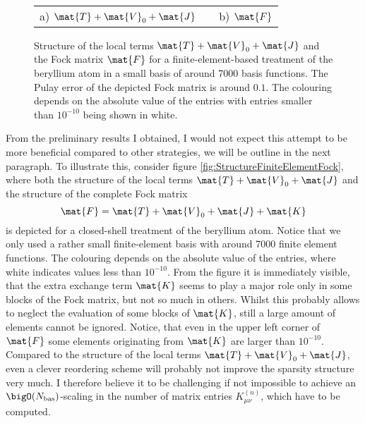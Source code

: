 \begin{figure}
	\centering
	\\[-0.7em]
	\begin{tabularx}{0.67\textwidth}{XcX}
		a) $\mat{T} + \mat{V}_0 + \mat{J}$ & \hspace{0.27\textwidth} &
		\hspace{0.02\textwidth}b) $\mat{F}$
	\end{tabularx}
	\caption[Local terms and Fock matrix for a finite-element-based Hartree-Fock]
		{Structure of the local terms $\mat{T}+\mat{V}_0 + \mat{J}$
		and the Fock matrix $\mat{F}$
		for a finite-element-based \HF treatment
		of the beryllium atom
		in a small \FE basis of around 7000 basis functions.
		The Pulay error of the depicted Fock matrix
		is around $0.1$.
		The colouring depends on the absolute value of the entries
		with entries smaller than $10^{-10}$ being shown in white.
	}
	\label{fig:StructureFiniteElementFock}
\end{figure}

From the preliminary results I obtained,
I would not expect this attempt to be more beneficial
compared to other strategies, we will be outline in the next paragraph.
To illustrate this, consider figure \vref{fig:StructureFiniteElementFock},
where both the structure of the local terms $\mat{T}+\mat{V}_0 + \mat{J}$
and the structure of the complete Fock matrix
\[ \mat{F} = \mat{T}+\mat{V}_0 + \mat{J} + \mat{K} \]
is depicted for a closed-shell treatment of the beryllium atom.
Notice that we only used a rather small finite-element basis with
around 7000 finite element functions.
The colouring depends on the absolute value of the entries,
where white indicates values less than $10^{-10}$.
From the figure it is immediately visible,
that the extra exchange term $\mat{K}$
seems to play a major role only in some blocks of the Fock matrix,
but not so much in others.
Whilst this probably allows to neglect the evaluation
of some blocks of $\mat{K}$,
still a large amount of elements cannot be ignored.
Notice, that even in the upper left corner of $\mat{F}$
some elements originating from $\mat{K}$ are larger than $10^{-10}$.
Compared to the structure of the local terms $\mat{T}+\mat{V}_0 + \mat{J}$,
even a clever reordering scheme
will probably not improve the sparsity structure very much.
I therefore believe it to be challenging if not impossible
to achieve an $\bigO(\Nbas)$-scaling in the number
of matrix entries $K^{(n)}_{\mu\nu}$,
which have to be computed.


